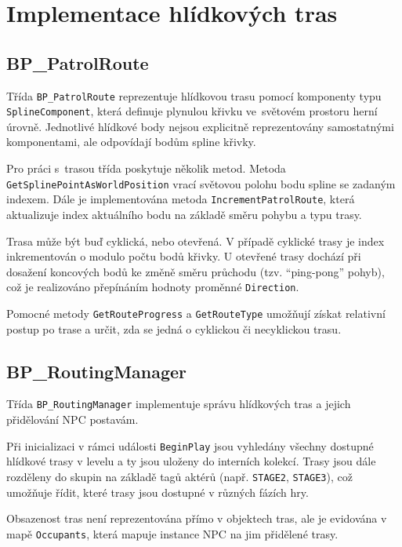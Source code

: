 \section{Implementace hlídkových tras}
\label{sec:implementace-routing}

\subsection{BP\_PatrolRoute}

Třída \texttt{BP\_PatrolRoute} reprezentuje hlídkovou trasu pomocí komponenty typu \texttt{SplineComponent}, která definuje plynulou křivku 
ve~světovém prostoru herní úrovně. 
Jednotlivé hlídkové body nejsou explicitně reprezentovány samostatnými komponentami, ale odpovídají bodům spline křivky.

Pro práci s~trasou třída poskytuje několik metod. 
Metoda \texttt{GetSplinePointAsWorldPosition} vrací světovou polohu bodu spline se zadaným indexem.
Dále je implementována metoda \texttt{IncrementPatrolRoute}, která aktualizuje index aktuálního bodu na základě směru pohybu a typu trasy.

Trasa může být buď cyklická, nebo otevřená. 
V případě cyklické trasy je index inkrementován o modulo počtu bodů křivky.
U otevřené trasy dochází při dosažení koncových bodů ke změně směru průchodu (tzv. ``ping-pong'' pohyb), což je realizováno přepínáním hodnoty 
proměnné \texttt{Direction}.

Pomocné metody \texttt{GetRouteProgress} a \texttt{GetRouteType}
umožňují získat relativní postup po trase a určit, zda se jedná
o cyklickou či necyklickou trasu.

\subsection{BP\_RoutingManager}

Třída \texttt{BP\_RoutingManager} implementuje správu hlídkových
tras a jejich přidělování NPC postavám.

Při inicializaci v rámci události \texttt{BeginPlay} jsou vyhledány všechny dostupné 
hlídkové trasy v levelu a ty jsou uloženy do interních kolekcí.
Trasy jsou dále rozděleny do skupin na základě tagů aktérů (např. \texttt{STAGE2}, \texttt{STAGE3}), což umožňuje řídit, které trasy jsou dostupné 
v různých fázích hry.

Obsazenost tras není reprezentována přímo v objektech tras, ale je evidována v mapě \texttt{Occupants}, která mapuje instance NPC na jim přidělené trasy.

